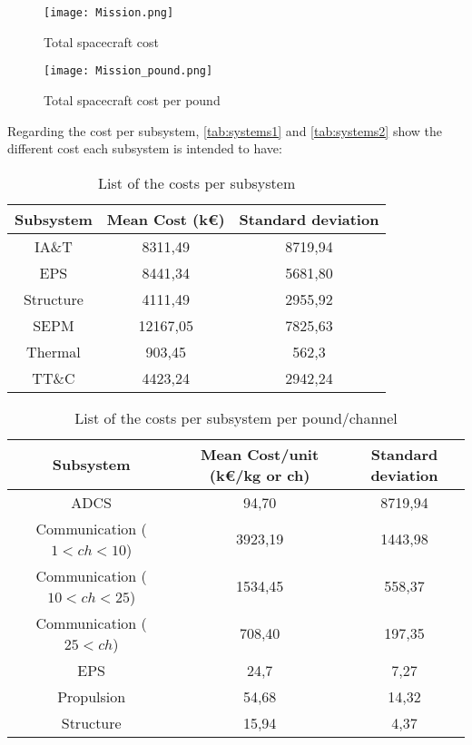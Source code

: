 	\begin{figure}
		\centering
		\begin{minipage}{1\textwidth}
		\centering
		\texttt{[image: Mission.png]}
		\caption{Total spacecraft cost}
		\label{fig:mission}
		\end{minipage}
		\hspace{20mm}
		\begin{minipage}{.95\textwidth}
		\centering
		\texttt{[image: Mission\_pound.png]}
		\caption{Total spacecraft cost per pound}
		\label{fig:mission_pound}
		\end{minipage}
	\end{figure}

	Regarding the cost per subsystem, \autoref{tab:systems1} and \autoref{tab:systems2} show the different cost each subsystem is intended to have:

	\begin{table}
		\centering
		\begin{tabular}{ccc}
		\toprule
		Subsystem & Mean Cost (k\euro) & Standard deviation\\
		\midrule
		IA\&T     & 8311,49   & 8719,94\\
		EPS        & 8441,34   & 5681,80\\
		Structure & 4111,49   & 2955,92\\
		SEPM      & 12167,05 & 7825,63\\
		Thermal  & 903,45    & 562,3\\
		TT\&C    & 4423,24   & 2942,24\\
		\bottomrule
		\end{tabular}
		\caption{List of the costs per subsystem}
		\label{tab:systems1}
	\end{table}

	\begin{table}
		\centering
		\begin{tabular}{ccc}
		\toprule
		Subsystem & Mean Cost/unit (k\euro/kg or ch) & Standard deviation\\
		\midrule
		ADCS                                         & 94,70     & 8719,94\\
		Communication ($1 < ch < 10$)   & 3923,19 & 1443,98\\
		Communication ($10 < ch < 25$) & 1534,45 & 558,37\\
		Communication ($25 < ch$)         & 708,40   & 197,35\\
		EPS                                            & 24,7      & 7,27\\
		Propulsion                                  & 54,68     & 14,32\\
		Structure                                    & 15,94     & 4,37\\
		\bottomrule
		\end{tabular}
		\caption{List of the costs per subsystem per pound/channel}
		\label{tab:systems2}
	\end{table}

